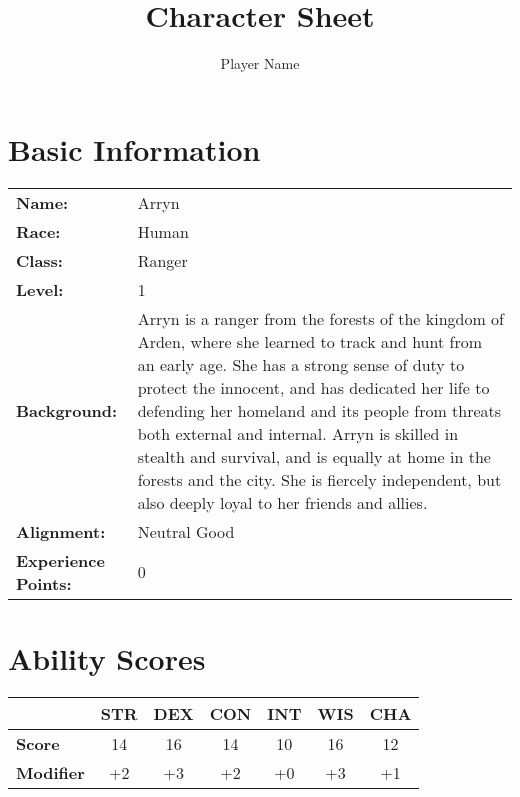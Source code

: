 \documentclass[12pt]{article}
\title{Character Sheet}
\author{Player Name}
\begin{document}
\maketitle

\section{Basic Information}
\begin{tabularx}{\linewidth}{lX}
\textbf{Name:} & Arryn \\
\textbf{Race:} & Human \\
\textbf{Class:} & Ranger \\
\textbf{Level:} & 1 \\
\textbf{Background:} & Arryn is a ranger from the forests of the kingdom of Arden, where she learned to track and hunt from an early age. She has a strong sense of duty to protect the innocent, and has dedicated her life to defending her homeland and its people from threats both external and internal. Arryn is skilled in stealth and survival, and is equally at home in the forests and the city. She is fiercely independent, but also deeply loyal to her friends and allies. \\
\textbf{Alignment:} & Neutral Good \\
\textbf{Experience Points:} & 0 \\
\end{tabularx}

\section{Ability Scores}
\begin{tabularx}{\linewidth}{lcccccc}
\toprule
& \textbf{STR} & \textbf{DEX} & \textbf{CON} & \textbf{INT} & \textbf{WIS} & \textbf{CHA} \\
\midrule
\textbf{Score} & 14 & 16 & 14 & 10 & 16 & 12 \\
\textbf{Modifier} & +2 & +3 & +2 & +0 & +3 & +1 \\
\bottomrule
\end{tabularx}
\end{document}
